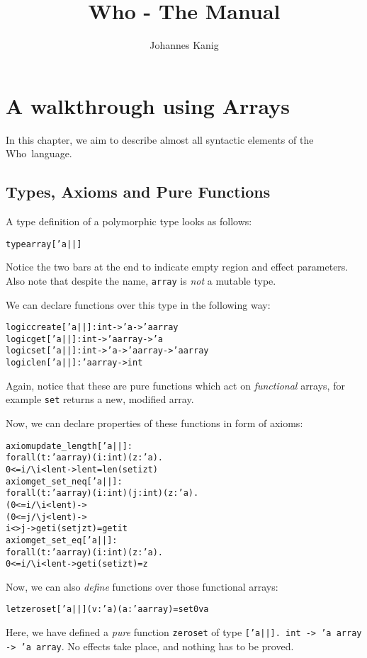 \documentclass[a4paper]{scrreprt}
\newcommand{\who}{Who\xspace}
\begin{document}
\title{Who - The Manual}
\author{Johannes Kanig}

\maketitle
\tableofcontents

\chapter{A walkthrough using Arrays}

In this chapter, we aim to describe almost all syntactic elements of the
\who~language.

\section{Types, Axioms and Pure Functions}

A type definition of a polymorphic type looks as follows:
\begin{alltt}
  type array ['a||]
\end{alltt}
Notice the two bars at the end to indicate empty region and effect parameters.
Also note that despite the name, {\tt array} is {\em not} a mutable type.

We can declare functions over this type in the following way:
\begin{alltt}
  logic create ['a||] :  int -> 'a -> 'a array
  logic get ['a||] : int -> 'a array -> 'a
  logic set ['a||]: int -> 'a -> 'a array -> 'a array 
  logic len ['a||] :  'a array -> int
\end{alltt}
Again, notice that these are pure functions which act on {\em functional}
arrays, for example {\tt set} returns a new, modified array.

Now, we can declare properties of these functions in form of axioms:
\begin{alltt}
  axiom update_length ['a||] : 
    forall (t : 'a array) (i : int) (z : 'a).
    0 <= i \verb|/\| i < len t -> len t = len (set i z t)
  axiom get_set_neq ['a||] : 
    forall (t : 'a array ) (i : int) (j : int) (z : 'a).
      (0 <= i \verb|/\| i < len t) -> 
      (0 <= j \verb|/\| j < len t) -> 
        i <> j -> get i (set j z t) = get i t
  axiom get_set_eq ['a||] : 
    forall (t : 'a array) (i : int) (z : 'a).
      0 <= i \verb|/\| i < len t -> get i (set i z t) = z
\end{alltt}

Now, we can also {\em define} functions over those functional arrays:
\begin{alltt}
  let zeroset ['a||] (v : 'a) (a : 'a array) = set 0 v a
\end{alltt}
Here, we have defined a {\em pure} function {\tt zeroset} of type {\tt ['a||].
int -> 'a array -> 'a array}. No effects take place, and nothing has to be
proved.
\end{document}
